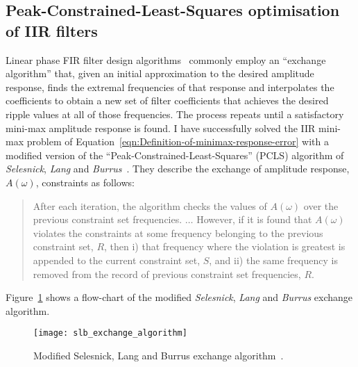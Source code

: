 \documentclass[a4paper,twoside,10pt,english]{article}
\newcommand{\DesignOfSchurLatticeFiltersIncludeScale}{0.85}
\begin{document}
\subsection{Peak-Constrained-Least-Squares optimisation of IIR filters}
Linear phase FIR filter design
algorithms~\cite{Hofstetter_DesignNonRecursiveDigitalFilters,
  ParksMcClellan_ChebyshevApproxNonRecursiveDigitalFilters,
  SelesnickBurrus_ExchangeAlgorithmsLinearPhaseFIRFilters,
  SelesnickLangBurrus_ConstrainedLeastSquareMultiBandFIRFilters} commonly
employ an ``exchange algorithm'' that, given an initial approximation to the
desired amplitude response, finds the extremal frequencies of that response and
interpolates the coefficients to obtain a new set of filter coefficients that
achieves the desired ripple values at all of those frequencies. The process
repeats until a satisfactory mini-max amplitude response is found. I have
successfully solved the IIR mini-max problem of
Equation~\ref{eqn:Definition-of-minimax-response-error} with a modified version
of the ``Peak-Constrained-Least-Squares'' (PCLS) algorithm of \emph{Selesnick},
\emph{Lang} and \emph{Burrus}~\cite[p.498]
{SelesnickLangBurrus_ConstrainedLeastSquareMultiBandFIRFilters}. They describe
the exchange of amplitude response, $A\left(\omega\right)$, constraints as
follows:
\begin{quotation}
  After each iteration, the algorithm checks the values of
  $A\left(\omega\right)$ over the previous constraint set frequencies. $\hdots$
  However, if it is found that $A\left(\omega\right)$ violates the constraints
  at some frequency belonging to the previous constraint set, $R$, then i) that
  frequency where the violation is greatest is appended to the current
  constraint set, $S$, and ii) the same frequency is removed from the
  record of previous constraint set frequencies, $R$.
\end{quotation}

Figure~\ref{fig:Modified-Selesnick-Lang-Burrus-algorithm} shows a flow-chart of
the modified \emph{Selesnick}, \emph{Lang} and \emph{Burrus} exchange algorithm.

\begin{figure}
\centering
\texttt{[image: slb\_exchange\_algorithm]}
\caption{Modified Selesnick, Lang and Burrus exchange algorithm~\cite[p.498]
  {SelesnickLangBurrus_ConstrainedLeastSquareMultiBandFIRFilters}.}
\label{fig:Modified-Selesnick-Lang-Burrus-algorithm}
\end{figure}
\end{document}
